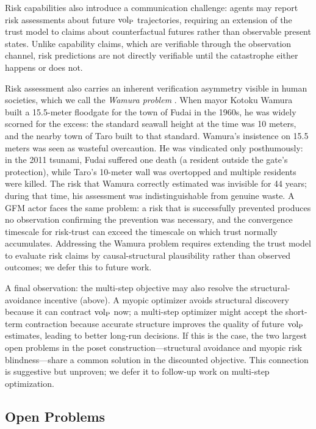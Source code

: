 Risk capabilities also introduce a communication challenge: agents may report
risk assessments about future ${\operatorname{vol}_{\mathrm{P}}}$ trajectories, requiring an extension of
the trust model to claims about counterfactual futures rather than observable
present states. Unlike capability claims, which are verifiable through the
observation channel, risk predictions are not directly verifiable until the
catastrophe either happens or does not.

Risk assessment also carries an inherent verification asymmetry visible in
human societies, which we call the \emph{Wamura problem}
\citep{fackler2011fudai}. When mayor Kotoku Wamura built a 15.5-meter
floodgate for the town of Fudai in the 1960s, he
was widely scorned for the excess: the standard seawall height at the time was
10 meters, and the nearby town of Taro built to that standard. Wamura's
insistence on 15.5 meters was seen as wasteful overcaution. He was vindicated
only posthumously: in the 2011 tsunami, Fudai suffered one death (a resident
outside the gate's protection), while Taro's 10-meter wall was overtopped and
multiple residents were killed. The risk that Wamura correctly estimated was
invisible for 44 years; during that time, his assessment was
indistinguishable from genuine waste. A GFM actor faces the same problem: a
risk that is successfully prevented produces no observation confirming the
prevention was necessary, and the convergence timescale for risk-trust can
exceed the timescale on which trust normally accumulates. Addressing the
Wamura problem requires extending the trust model to evaluate risk claims by
causal-structural plausibility rather than observed outcomes; we defer this to
future work.

A final observation: the multi-step objective may also resolve the
structural-avoidance incentive (above). A myopic optimizer avoids structural
discovery because it can contract ${\operatorname{vol}_{\mathrm{P}}}$ now; a multi-step optimizer might
accept the short-term contraction because accurate structure improves the
quality of future ${\operatorname{vol}_{\mathrm{P}}}$ estimates, leading to better long-run decisions. If
this is the case, the two largest open problems in the poset
construction---structural avoidance and myopic risk blindness---share a common
solution in the discounted objective. This connection is suggestive but
unproven; we defer it to follow-up work on multi-step optimization.

\subsection{Open Problems}


